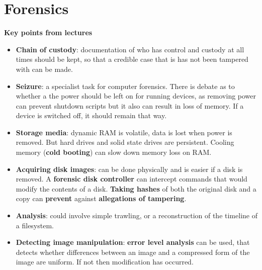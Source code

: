 \documentclass[final]{article}
\begin{document}
\section{Forensics}
\textbf{Key points from lectures}
\begin{itemize}
	\item \textbf{Chain of custody}: documentation of who has control and custody at all times should be kept, so that a credible case that is has not been tampered with can be made.
	\item \textbf{Seizure}: a specialist task for computer forensics. There is debate as to whether a the power should be left on for running devices, as removing power can prevent shutdown scripts but it also can result in loss of memory. If a device is switched off, it should remain that way.
	\item \textbf{Storage media}: dynamic RAM is volatile, data is lost when power is removed. But hard drives and solid state drives are persistent. Cooling memory (\textbf{cold booting}) can slow down memory loss on RAM.
	\item \textbf{Acquiring disk images}: can be done physically and is easier if a disk is removed. A \textbf{forensic disk controller} can intercept commands that would modify the contents of a disk. \textbf{Taking hashes} of both the original disk and a copy can \textbf{prevent} against \textbf{allegations of tampering}.
	\item \textbf{Analysis}: could involve simple trawling, or a reconstruction of the timeline of a filesystem.
	\item  \textbf{Detecting image manipulation}: \textbf{error level analysis} can be used, that detects whether differences between an image and a compressed form of the image are uniform. If not then modification has occurred.
\end{itemize}
\end{document}
